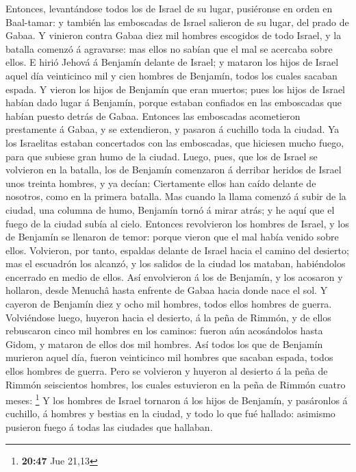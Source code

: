  Entonces, levantándose todos los de Israel de su lugar,
pusiéronse en orden en Baal-tamar: y también las emboscadas de Israel
salieron de su lugar, del prado de Gabaa.  Y vinieron
contra Gabaa diez mil hombres escogidos de todo Israel, y la batalla
comenzó á agravarse: mas ellos no sabían que el mal se acercaba sobre
ellos.  E hirió Jehová á Benjamín delante de Israel; y
mataron los hijos de Israel aquel día veinticinco mil y cien hombres de
Benjamín, todos los cuales sacaban espada.  Y vieron los
hijos de Benjamín que eran muertos; pues los hijos de Israel habían dado
lugar á Benjamín, porque estaban confiados en las emboscadas que habían
puesto detrás de Gabaa.  Entonces las emboscadas
acometieron prestamente á Gabaa, y se extendieron, y pasaron á cuchillo
toda la ciudad.  Ya los Israelitas estaban concertados con
las emboscadas, que hiciesen mucho fuego, para que subiese gran humo de
la ciudad.  Luego, pues, que los de Israel se volvieron en
la batalla, los de Benjamín comenzaron á derribar heridos de Israel unos
treinta hombres, y ya decían: Ciertamente ellos han caído delante de
nosotros, como en la primera batalla.  Mas cuando la llama
comenzó á subir de la ciudad, una columna de humo, Benjamín tornó á
mirar atrás; y he aquí que el fuego de la ciudad subía al cielo.
 Entonces revolvieron los hombres de Israel, y los de
Benjamín se llenaron de temor: porque vieron que el mal había venido
sobre ellos.  Volvieron, por tanto, espaldas delante de
Israel hacia el camino del desierto; mas el escuadrón los alcanzó, y los
salidos de la ciudad los mataban, habiéndolos encerrado en medio de
ellos.  Así envolvieron á los de Benjamín, y los acosaron y
hollaron, desde Menuchâ hasta enfrente de Gabaa hacia donde nace el sol.
 Y cayeron de Benjamín diez y ocho mil hombres, todos ellos
hombres de guerra.  Volviéndose luego, huyeron hacia el
desierto, á la peña de Rimmón, y de ellos rebuscaron cinco mil hombres
en los caminos: fueron aún acosándolos hasta Gidom, y mataron de ellos
dos mil hombres.  Así todos los que de Benjamín murieron
aquel día, fueron veinticinco mil hombres que sacaban espada, todos
ellos hombres de guerra.  Pero se volvieron y huyeron al
desierto á la peña de Rimmón seiscientos hombres, los cuales estuvieron
en la peña de Rimmón cuatro meses: \footnote{\textbf{20:47} Jue 21,13}
 Y los hombres de Israel tornaron á los hijos de Benjamín,
y pasáronlos á cuchillo, á hombres y bestias en la ciudad, y todo lo que
fué hallado: asimismo pusieron fuego á todas las ciudades que hallaban.

